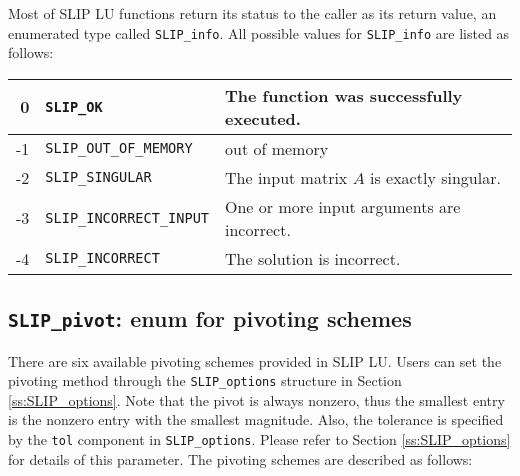 \documentclass[12pt]{article}
\theoremstyle{definition}
\begin{document}
Most of SLIP LU functions return its status to the caller as its return value,
an enumerated type called \verb|SLIP_info|. All possible values for
\verb|SLIP_info| are listed as follows:

\begin{center}
\begin{tabular}{rll}
\hline
    0& \verb|SLIP_OK|& The function was successfully executed.\\
\hline
    -1& \verb|SLIP_OUT_OF_MEMORY|& out of memory\\
\hline
    -2& \verb|SLIP_SINGULAR|& The input matrix $A$ is exactly singular.\\
\hline
    -3& \verb|SLIP_INCORRECT_INPUT|& One or more input arguments are incorrect.\\
\hline
    -4& \verb|SLIP_INCORRECT|& The solution is incorrect.\\
\hline
\end{tabular}
\end{center}

\cprotect\subsection{\verb|SLIP_pivot|: enum for pivoting schemes}
\label{ss:SLIP_pivot}

There are six available pivoting schemes provided in SLIP LU.  Users can set
the pivoting method through the \verb|SLIP_options| structure in Section
\ref{ss:SLIP_options}. Note that the pivot is always nonzero, thus the smallest
entry is the nonzero entry with the smallest magnitude.  Also, the tolerance is
specified by the \verb|tol| component in \verb|SLIP_options|.  Please refer to
Section \ref{ss:SLIP_options} for details of this parameter. The pivoting
schemes are described as follows:
\end{document}
